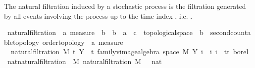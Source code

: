 \begin{isabellebody}
%
\isadelimdocument
%
\endisadelimdocument
%
\isatagdocument
%
\isamarkuptrue%
%
\endisatagdocument
{\isafolddocument}%
%
\isadelimdocument
%
\endisadelimdocument
%
\begin{isamarkuptext}%
The natural filtration induced by a stochastic process  is the filtration generated by all events involving the process up to the time index , i.e. .%
\end{isamarkuptext}\isamarkuptrue%
\isamarkupfalse%
\ natural{\isacharunderscore}{\kern0pt}filtration\ {\isacharcolon}{\kern0pt}{\isacharcolon}{\kern0pt}\ {\isachardoublequoteopen}{\isacharprime}{\kern0pt}a\ measure\ {\isasymRightarrow}\ {\isacharprime}{\kern0pt}b\ {\isasymRightarrow}\ {\isacharparenleft}{\kern0pt}{\isacharprime}{\kern0pt}b\ {\isasymRightarrow}\ {\isacharprime}{\kern0pt}a\ {\isasymRightarrow}\ {\isacharprime}{\kern0pt}c\ {\isacharcolon}{\kern0pt}{\isacharcolon}{\kern0pt}\ topological{\isacharunderscore}{\kern0pt}space{\isacharparenright}{\kern0pt}\ {\isasymRightarrow}\ {\isacharprime}{\kern0pt}b\ {\isacharcolon}{\kern0pt}{\isacharcolon}{\kern0pt}\ {\isacharbraceleft}{\kern0pt}second{\isacharunderscore}{\kern0pt}countable{\isacharunderscore}{\kern0pt}topology{\isacharcomma}{\kern0pt}\ order{\isacharunderscore}{\kern0pt}topology{\isacharbraceright}{\kern0pt}\ {\isasymRightarrow}\ {\isacharprime}{\kern0pt}a\ measure{\isachardoublequoteclose}\ \isanewline
\ \ {\isachardoublequoteopen}natural{\isacharunderscore}{\kern0pt}filtration\ M\ t\ Y\ {\isacharequal}{\kern0pt}\ {\isacharparenleft}{\kern0pt}{\isasymlambda}t{\isachardot}{\kern0pt}\ family{\isacharunderscore}{\kern0pt}vimage{\isacharunderscore}{\kern0pt}algebra\ {\isacharparenleft}{\kern0pt}space\ M{\isacharparenright}{\kern0pt}\ {\isacharbraceleft}{\kern0pt}Y\ i\ {\isacharbar}{\kern0pt}\ i{\isachardot}{\kern0pt}\ i\ {\isasymin}\ {\isacharbraceleft}{\kern0pt}tt{\isacharbraceright}{\kern0pt}{\isacharbraceright}{\kern0pt}\ borel{\isacharparenright}{\kern0pt}{\isachardoublequoteclose}\isanewline
\isanewline
{}\isamarkupfalse%
\ {\isachardoublequoteopen}nat{\isacharunderscore}{\kern0pt}natural{\isacharunderscore}{\kern0pt}filtration\ {\isasymequiv}\ {\isasymlambda}M{\isachardot}{\kern0pt}\ natural{\isacharunderscore}{\kern0pt}filtration\ M\ {\isacharparenleft}{\kern0pt}{}\ {\isacharcolon}{\kern0pt}{\isacharcolon}{\kern0pt}\ nat{\isacharparenright}{\kern0pt}{\isachardoublequoteclose}\isanewline

\end{isabellebody}
